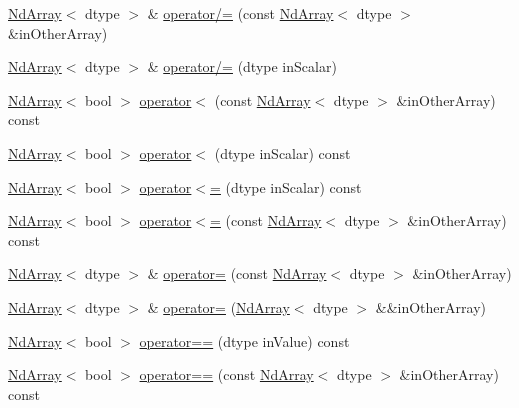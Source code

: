 \begin{DoxyCompactItemize}
\item 
\mbox{\hyperlink{class_num_c_1_1_nd_array}{Nd\+Array}}$<$ dtype $>$ \& \mbox{\hyperlink{class_num_c_1_1_nd_array_af9950420762002d301c396e1d5ab0858}{operator/=}} (const \mbox{\hyperlink{class_num_c_1_1_nd_array}{Nd\+Array}}$<$ dtype $>$ \&in\+Other\+Array)
\item 
\mbox{\hyperlink{class_num_c_1_1_nd_array}{Nd\+Array}}$<$ dtype $>$ \& \mbox{\hyperlink{class_num_c_1_1_nd_array_a367f7ca671c2c35bda980bb7fff8adf2}{operator/=}} (dtype in\+Scalar)
\item 
\mbox{\hyperlink{class_num_c_1_1_nd_array}{Nd\+Array}}$<$ bool $>$ \mbox{\hyperlink{class_num_c_1_1_nd_array_a206b5abfcdd532efadeec123979dcb08}{operator$<$}} (const \mbox{\hyperlink{class_num_c_1_1_nd_array}{Nd\+Array}}$<$ dtype $>$ \&in\+Other\+Array) const
\item 
\mbox{\hyperlink{class_num_c_1_1_nd_array}{Nd\+Array}}$<$ bool $>$ \mbox{\hyperlink{class_num_c_1_1_nd_array_ae6e2f419585540a0198dd500f2c6a547}{operator$<$}} (dtype in\+Scalar) const
\item 
\mbox{\hyperlink{class_num_c_1_1_nd_array}{Nd\+Array}}$<$ bool $>$ \mbox{\hyperlink{class_num_c_1_1_nd_array_a6ca5d2e5f0365adf35747b26fd4a892f}{operator$<$=}} (dtype in\+Scalar) const
\item 
\mbox{\hyperlink{class_num_c_1_1_nd_array}{Nd\+Array}}$<$ bool $>$ \mbox{\hyperlink{class_num_c_1_1_nd_array_ab99797f22be77924d4c54a6c54829fa1}{operator$<$=}} (const \mbox{\hyperlink{class_num_c_1_1_nd_array}{Nd\+Array}}$<$ dtype $>$ \&in\+Other\+Array) const
\item 
\mbox{\hyperlink{class_num_c_1_1_nd_array}{Nd\+Array}}$<$ dtype $>$ \& \mbox{\hyperlink{class_num_c_1_1_nd_array_a77394f32f4c803587139f379ebd738d0}{operator=}} (const \mbox{\hyperlink{class_num_c_1_1_nd_array}{Nd\+Array}}$<$ dtype $>$ \&in\+Other\+Array)
\item 
\mbox{\hyperlink{class_num_c_1_1_nd_array}{Nd\+Array}}$<$ dtype $>$ \& \mbox{\hyperlink{class_num_c_1_1_nd_array_a7c463b2a87b68f63eeb83c88c55ffbe4}{operator=}} (\mbox{\hyperlink{class_num_c_1_1_nd_array}{Nd\+Array}}$<$ dtype $>$ \&\&in\+Other\+Array)
\item 
\mbox{\hyperlink{class_num_c_1_1_nd_array}{Nd\+Array}}$<$ bool $>$ \mbox{\hyperlink{class_num_c_1_1_nd_array_aba7821dd819fd42024c36706816dd4a6}{operator==}} (dtype in\+Value) const
\item 
\mbox{\hyperlink{class_num_c_1_1_nd_array}{Nd\+Array}}$<$ bool $>$ \mbox{\hyperlink{class_num_c_1_1_nd_array_a3abe0b9a995e04444d124a4d3b4b332e}{operator==}} (const \mbox{\hyperlink{class_num_c_1_1_nd_array}{Nd\+Array}}$<$ dtype $>$ \&in\+Other\+Array) const

\end{DoxyCompactItemize}
